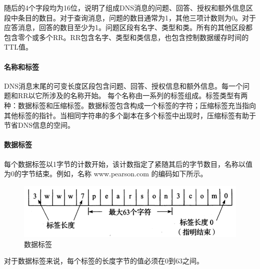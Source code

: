 \documentclass[]{article}
\begin{document}
            随后的4个字段均为16位，说明了组成DNS消息的问题、回答、授权和额外信息区段中条目的数目。对于查询消息，问题的数目通常为1，其他三项计数则为0。对于应答消息，回答的数目至少为1。问题区段有名字、类型和类。所有的其他区段都包含零个或多个RR。RR包含名字、类型和类信息，也包含控制数据缓存时间的TTL值。

            \paragraph{名称和标签}
                DNS消息末尾的可变长度区段包含问题、回答、授权信息和额外信息。每一个问题和RR以它所涉及的名称开始。
                每个名称由一系列的标签组成。标签类型有两种：数据标签和压缩标签。数据标签包含构成一个标签的字符；压缩标签充当指向其他标签的指针。当相同字符串的多个副本在多个标签中出现时，压缩标签有助于节省DNS信息的空间。

            \paragraph{数据标签}
                每个数据标签以1字节的计数开始，该计数指定了紧随其后的字节数目，名称以值为0的字节结束。例如，名称 www.pearson.com 的编码如下所示。
                \begin{figure}[ht]
                    \centering
                    \includegraphics[scale=0.6]{datalabel.png}
                    \caption{数据标签}
                \end{figure}
                对于数据标签来说，每个标签的长度字节的值必须在0到63之间。
\end{document}
